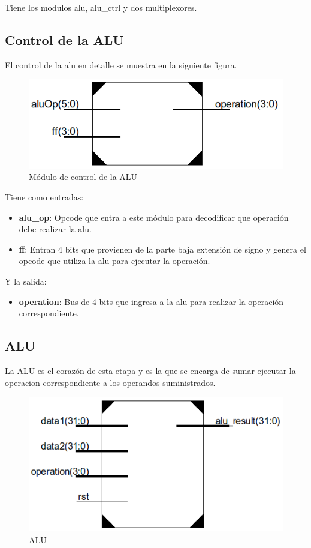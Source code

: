 Tiene los modulos alu, alu\_ctrl y dos multiplexores.

\subsection{Control de la ALU}
El control de la alu en detalle se muestra en la siguiente figura.

\begin{figure}[H]
\centering
\includegraphics[scale=0.5]{img/alu_ctrl}
\caption{M\'odulo de control de la ALU}
\label{fig:fetch}
\end{figure}

Tiene como entradas:

\begin{itemize}
  \item \textbf{alu\_op}: Opcode que entra a este m\'odulo para decodificar que operaci\'on debe realizar la alu.
  \item \textbf{ff}: Entran 4 bits que provienen de la parte baja extensi\'on de signo y genera el opcode que utiliza la alu para ejecutar la operaci\'on.  
\end{itemize}

Y la salida:
\begin{itemize}
  \item \textbf{operation}: Bus de 4 bits que ingresa a la alu para realizar la operaci\'on correspondiente.
\end{itemize}

\subsection{ALU} 
La ALU es el coraz\'on de esta etapa y es la que se encarga de sumar ejecutar la operacion correspondiente a los operandos suministrados.

\begin{figure}[H]
\centering
\includegraphics[scale=0.5]{img/alu}
\caption{ALU}
\label{fig:fetch}
\end{figure}


